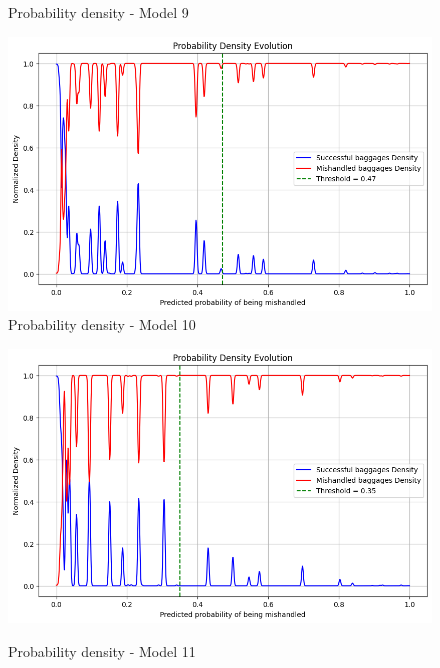 \documentclass[12pt]{article}
\begin{document}
\begin{figure}
\begin{minipage}[c]{0.5\linewidth}
    \caption{Probability density - Model 9}
\end{minipage}
\hfill
\begin{minipage}[c]{0.5\linewidth}
    \includegraphics[width=1\textwidth]{Probability_density_Model 10.png}\\
    \caption{Probability density - Model 10}
\end{minipage}%
\break
\begin{minipage}[c]{0.5\linewidth}
    \includegraphics[width=1\textwidth]{Probability_density_Model 11.png}\\
    \caption{Probability density - Model 11}
    \label{fig:Probability_density_Model 11}
\end{minipage}
\hfill
\begin{minipage}[c]{0.5\linewidth}
\end{minipage}%
\end{figure}
\FloatBarrier
\end{document}
